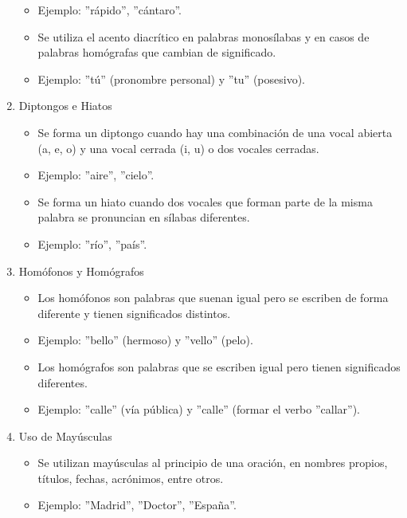 \begin{enumerate}
\begin{itemize}
                  \item Ejemplo: ''rápido'', ''cántaro''.
                  \item Se utiliza el acento diacrítico en palabras monosílabas y en casos de palabras homógrafas que cambian de significado.
                  \item Ejemplo: ''tú'' (pronombre personal) y ''tu'' (posesivo).
            \end{itemize}
      \item Diptongos e Hiatos
            \begin{itemize}
                  \item Se forma un diptongo cuando hay una combinación de una vocal abierta (a, e, o) y una vocal cerrada (i, u) o dos vocales cerradas.
                  \item Ejemplo: ''aire'', ''cielo''.
                  \item Se forma un hiato cuando dos vocales que forman parte de la misma palabra se pronuncian en sílabas diferentes.
                  \item Ejemplo: ''río'', ''país''.
            \end{itemize}
      \item Homófonos y Homógrafos
            \begin{itemize}
                  \item Los homófonos son palabras que suenan igual pero se escriben de forma diferente y tienen significados distintos.
                  \item Ejemplo: ''bello'' (hermoso) y ''vello'' (pelo).
                  \item Los homógrafos son palabras que se escriben igual pero tienen significados diferentes.
                  \item Ejemplo: ''calle'' (vía pública) y ''calle'' (formar el verbo ''callar'').
            \end{itemize}
      \item Uso de Mayúsculas
            \begin{itemize}
                  \item Se utilizan mayúsculas al principio de una oración, en nombres propios, títulos, fechas, acrónimos, entre otros.
                  \item Ejemplo: ''Madrid'', ''Doctor'', ''España''.
            \end{itemize}
\end{enumerate}

